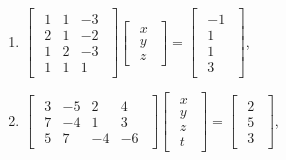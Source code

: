 \documentclass{article}
\begin{document}
\begin{enumerate}
\begin{enumerate}
            \item $\begin{bmatrix}\begin{array}{rrr} 1 & 1 & -3\\ 2 & 1 & -2\\ 1 & 2 & -3\\ 1 & 1 & 1 \end{array}\end{bmatrix} \begin{bmatrix}\begin{array}{r} x\\ y\\ z \end{array}\end{bmatrix} = \begin{bmatrix}\begin{array}{r} -1\\ 1\\ 1\\ 3 \end{array}\end{bmatrix}$,

             \item $\begin{bmatrix}\begin{array}{rrrr} 3 & -5 & 2 & 4\\ 7 & -4 & 1 & 3\\ 5 & 7 & -4 & -6 \end{array}\end{bmatrix} \begin{bmatrix}\begin{array}{r} x\\ y\\ z\\ t \end{array}\end{bmatrix} = \begin{bmatrix}\begin{array}{r} 2\\ 5\\ 3 \end{array}\end{bmatrix}$,


\end{enumerate}
\end{enumerate}
\end{document}

